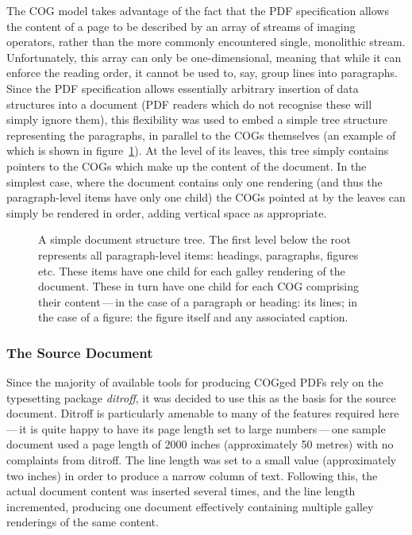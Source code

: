 \documentclass{sig-alternate}
\begin{document}
The COG model takes advantage of the fact that the PDF specification allows the content of a page to be described by an array of streams of imaging operators, rather than the more commonly encountered single, monolithic stream. Unfortunately, this array can only be one-di\-men\-sional, meaning that while it can enforce the reading order, it cannot be used to, say, group lines into paragraphs. Since the PDF specification allows essentially arbitrary insertion of data structures into a document (PDF readers which do not recognise these will simply ignore them), this flexibility was used to embed a simple tree structure representing the paragraphs, in parallel to the COGs themselves (an example of which is shown in figure~\ref{tree}). At the level of its leaves, this tree simply contains pointers to the COGs which make up the content of the document. In the simplest case, where the document contains only one rendering (and thus the pa\-ra\-graph-level items have only one child) the COGs pointed at by the leaves can simply be rendered in order, adding vertical space as appropriate.


\begin{figure}
	\centering
	\vspace{-12pt} %
	\caption{A simple document structure tree. The first level below the root represents all paragraph-level items: headings, paragraphs, figures etc. These items have one child for each galley rendering of the document. These in turn have one child for each COG comprising their content\,---\,in the case of a paragraph or heading: its lines; in the case of a figure: the figure itself and any associated caption.}\vspace{-3pt}
	\label{tree}
\end{figure}

\subsubsection{The Source Document}
Since the majority of available tools for producing COGged PDFs rely on the typesetting package \emph{ditroff}, it was decided to use this as the basis for the source document. Ditroff is particularly amenable to many of the features required here\,---\,it is quite happy to have its page length set to large numbers\,---\,one sample document used a page length of 2000 inches (approximately 50 metres) with no complaints from ditroff. The line length was set to a small value (approximately two inches) in order to produce a narrow column of text. Following this, the actual document content was inserted several times, and the line length incremented, producing one document effectively containing multiple galley renderings of the same content.
\end{document}
